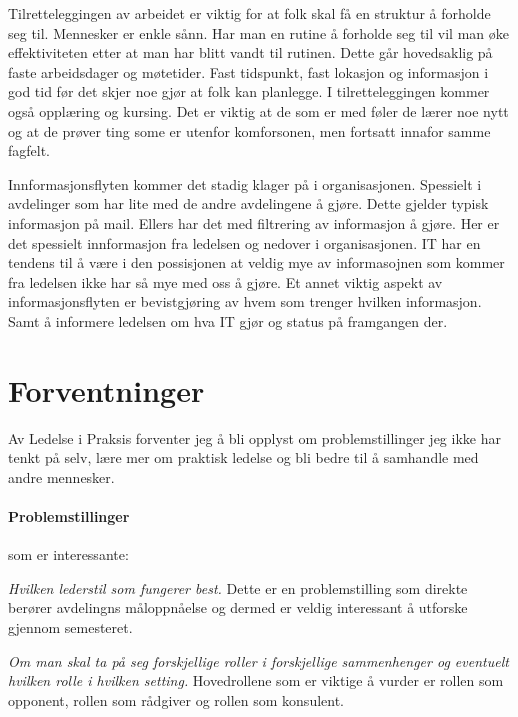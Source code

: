 \documentclass[12pt, a4paper]{article}
\begin{document}
Tilretteleggingen av arbeidet er viktig for at folk skal få en struktur å forholde seg til. Mennesker er enkle sånn. Har man en rutine å forholde seg til vil man øke effektiviteten etter at man har blitt vandt til rutinen. Dette går hovedsaklig på faste arbeidsdager og møtetider. Fast tidspunkt, fast lokasjon og informasjon i god tid før det skjer noe gjør at folk kan planlegge. I tilretteleggingen kommer også opplæring og kursing. Det er viktig at de som er med føler de lærer noe nytt og at de prøver ting some er utenfor komforsonen, men fortsatt innafor samme fagfelt. 

Innformasjonsflyten kommer det stadig klager på i organisasjonen. Spessielt i avdelinger som har lite med de andre avdelingene å gjøre. Dette gjelder typisk informasjon på mail. Ellers har det med filtrering av informasjon å gjøre. Her er det spessielt innformasjon fra ledelsen og nedover i organisasjonen. IT har en tendens til å være i den possisjonen at veldig mye av informasojnen som kommer fra ledelsen ikke har så mye med oss å gjøre. Et annet viktig aspekt av informasjonsflyten er bevistgjøring av hvem som trenger hvilken informasjon. Samt å informere ledelsen om hva IT gjør og status på framgangen der.  

\section{Forventninger}

Av Ledelse i Praksis forventer jeg å bli opplyst om problemstillinger jeg ikke
har tenkt på selv, lære mer om praktisk ledelse og bli bedre til å samhandle
med andre mennesker.  

\paragraph{Problemstillinger} som er interessante:

\textit{Hvilken lederstil som fungerer best.}
Dette er en problemstilling som direkte berører avdelingns måloppnåelse og
dermed er veldig interessant å utforske gjennom semesteret. 

\textit{Om man skal ta på seg forskjellige roller i forskjellige sammenhenger og
eventuelt hvilken rolle i hvilken setting.}
Hovedrollene som er viktige å vurder er rollen som opponent, rollen som
rådgiver og rollen som konsulent. 
\end{document}
